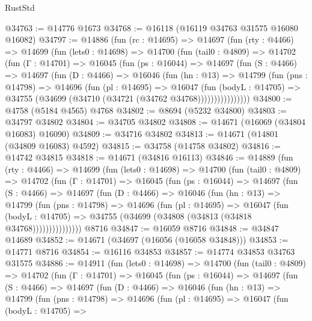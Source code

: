 \begin{lexlean}{RustStd}
\begin{coremodule}
@34763 := @14776 @1673
@34768 := @16118 (@16119 @34763 @31575 @16080 @16082)
@34797 := @14886
    (fun (rc : @14695) =>
    @14697
      (fun (rty : @4466) =>
      @14699
        (fun (lets0 : @14698) =>
        @14700
          (fun (tail0 : @4809) =>
          @14702
            (fun (Γ : @14701) =>
            @16045
              (fun (ps : @16044) =>
              @14697
                (fun (S : @4466) =>
                @14697
                  (fun (D : @4466) =>
                  @16046
                    (fun (hn : @13) =>
                    @14799
                      (fun (pns : @14798) =>
                      @14696
                        (fun (pl : @14695) =>
                        @16047
                          (fun (bodyL : @14705) =>
                          @34755 (@34699 (@34710 (@34721 (@34762 @34768))))))))))))))))
@34800 := @4758 (@5184 @4565) @4768
@34802 := @8694 (@5232 @34800)
@34803 := @34797 @34802
@34804 := @34705 @34802
@34808 := @14671 (@16069 (@34804 @16083) @16090)
@34809 := @34716 @34802
@34813 := @14671 (@14801 (@34809 @16083) @4592)
@34815 := @34758 (@14758 @34802)
@34816 := @14742 @34815
@34818 := @14671 (@34816 @16113)
@34846 := @14889
    (fun (rty : @4466) =>
    @14699
      (fun (lets0 : @14698) =>
      @14700
        (fun (tail0 : @4809) =>
        @14702
          (fun (Γ : @14701) =>
          @16045
            (fun (ps : @16044) =>
            @14697
              (fun (S : @4466) =>
              @14697
                (fun (D : @4466) =>
                @16046
                  (fun (hn : @13) =>
                  @14799
                    (fun (pns : @14798) =>
                    @14696
                      (fun (pl : @14695) =>
                      @16047
                        (fun (bodyL : @14705) =>
                        @34755 (@34699 (@34808 (@34813 (@34818 @34768)))))))))))))))
    @8716
@34847 := @16059 @8716
@34848 := @34847 @14689
@34852 := @14671 (@34697 (@16056 (@16058 @34848)))
@34853 := @14771 @8716
@34854 := @16116 @34853
@34857 := @14774 @34853 @34763 @31575
@34886 := @14911
    (fun (lets0 : @14698) =>
    @14700
      (fun (tail0 : @4809) =>
      @14702
        (fun (Γ : @14701) =>
        @16045
          (fun (ps : @16044) =>
          @14697
            (fun (S : @4466) =>
            @14697
              (fun (D : @4466) =>
              @16046
                (fun (hn : @13) =>
                @14799
                  (fun (pns : @14798) =>
                  @14696
                    (fun (pl : @14695) =>
                    @16047
                      (fun (bodyL : @14705) =>

\end{coremodule}
\end{lexlean}
